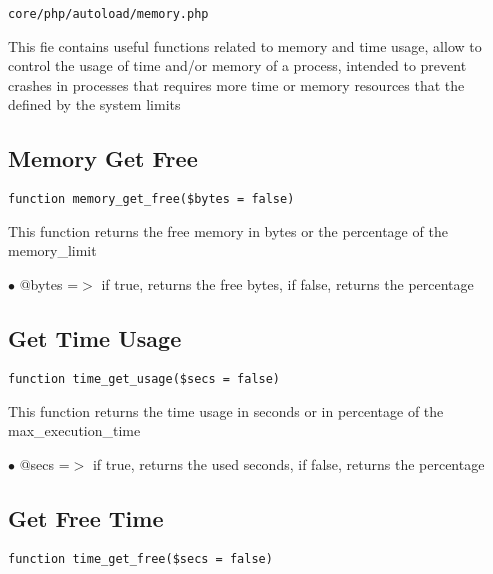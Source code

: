 \documentclass[a4paper]{book}
\begin{document}
\begin{lstlisting}
core/php/autoload/memory.php
\end{lstlisting}

This fie contains useful functions related to memory and time usage, allow to control the usage
of time and/or memory of a process, intended to prevent crashes in processes that requires more
time or memory resources that the defined by the system limits

\hypertarget{toc191}{}
\subsection{Memory Get Free}

\begin{lstlisting}
function memory_get_free($bytes = false)
\end{lstlisting}

This function returns the free memory in bytes or the percentage of the memory\_limit

\begin{compactitem}
\item[\color{myblue}$\bullet$] @bytes =$>$ if true, returns the free bytes, if false, returns the percentage
\end{compactitem}

\hypertarget{toc192}{}
\subsection{Get Time Usage}

\begin{lstlisting}
function time_get_usage($secs = false)
\end{lstlisting}

This function returns the time usage in seconds or in percentage of the max\_execution\_time

\begin{compactitem}
\item[\color{myblue}$\bullet$] @secs =$>$ if true, returns the used seconds, if false, returns the percentage
\end{compactitem}

\hypertarget{toc193}{}
\subsection{Get Free Time}

\begin{lstlisting}
function time_get_free($secs = false)
\end{lstlisting}
\end{document}
